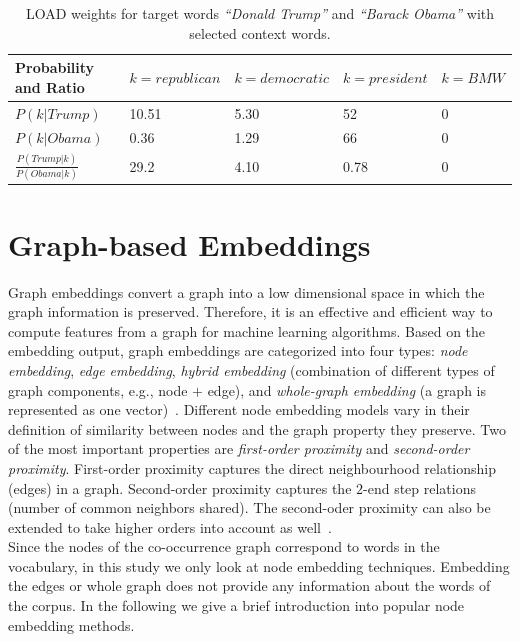 \begin{table}[]
\centering

\begin{tabular}{@{}l|l|l|l|l@{}}
\toprule
Probability and Ratio&  $k=republican$& $k=democratic$ & $k=president$ &$k= BMW$  \\ \midrule
 $P(k|Trump)$& {\color[HTML]{CB0000}10.51} &  {\color[HTML]{329A9D}5.30} & {\color[HTML]{CB0000}52} & {\color[HTML]{329A9D}0} \\\midrule
  $P(k|Obama)$&{\color[HTML]{329A9D}0.36}  & {\color[HTML]{CB0000}1.29} &  {\color[HTML]{CB0000}66}&{\color[HTML]{329A9D}0}  \\\midrule
 $\frac { P(Trump|k) }{ P(Obama|k) } $& {\color[HTML]{CB0000}29.2} &  {\color[HTML]{329A9D}4.10}&  0.78 &    0  \\\midrule
\end{tabular}%

\caption{LOAD weights for target words \emph{``Donald Trump''} and \emph{``Barack Obama''} with selected context words. }
\label{table:tab_2}
\end{table}
\label{sec:components_load}

\section{Graph-based Embeddings}
\label{sec:graph}
Graph embeddings convert a graph into a low dimensional space in which the graph information is preserved. Therefore, it is an effective and efficient way to compute features from a graph for machine learning algorithms. Based on the embedding output, graph embeddings are categorized into four types: \emph{node embedding}, \emph{edge embedding}, \emph{hybrid embedding} (combination of different types of graph components, e.g., node $+$ edge), and  \emph{whole-graph embedding} (a graph is represented as one vector)~. Different node embedding models vary in their definition of similarity between nodes and the graph property they preserve. Two of the most important properties are \emph{first-order proximity} and \emph{second-order proximity}. First-order proximity captures the direct neighbourhood relationship (edges) in a graph. Second-order proximity captures the $2$-end step relations (number of common neighbors shared). The second-oder proximity can also be extended to take higher orders into account as well~.\\
Since the nodes of the co-occurrence graph correspond to words in the vocabulary, in this study we only look at node embedding techniques. Embedding the edges or whole graph does not provide any information about the words of the corpus. In the following we give a brief introduction into popular node embedding methods. 

